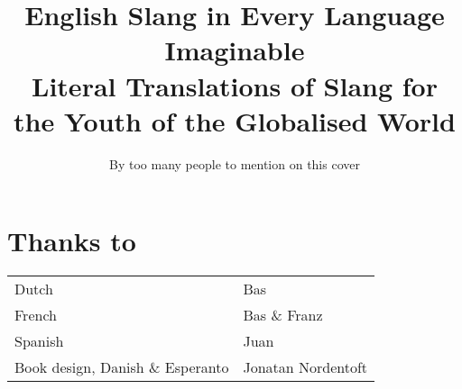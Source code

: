 \documentclass[a5paper,10pt]{book}
\title{\Huge \textbf{English Slang in Every Language Imaginable} \\ \huge Literal Translations of Slang for the Youth of the Globalised World}
\date{}
\author{By too many people to mention on this cover}
\begin{document}
\frontmatter
\maketitle

\tableofcontents

\mainmatter

\chapter{Thanks to}
\begin{tabularx}{\textwidth}{Xl}
Dutch & Bas \\
French & Bas \& Franz \\
Spanish & Juan \\
Book design, Danish \& Espe\-ranto & Jonatan Nordentoft
\end{tabularx}
\end{document}
